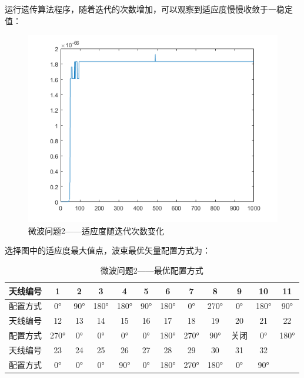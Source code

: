 \documentclass[UTF8,12pt]{ctexart}
\begin{document}
        运行遗传算法程序，随着迭代的次数增加，可以观察到适应度慢慢收敛于一稳定值：
        \begin{figure}[H]
            \centering
            \includegraphics[scale=0.7]{lian2.png}
            \caption{微波问题2——适应度随迭代次数变化}
            \end{figure}
        选择图中的适应度最大值点，波束最优矢量配置方式为：
      \begin{table}[htbp]
        \centering
        \caption{微波问题2——最优配置方式}
          \begin{tabular}{cccccccccccc}
          \toprule
          天线编号   & 1      & 2      & 3      & 4      & 5      & 6      & 7      & 8      & 9      & 10     & 11 \\
          \midrule
          配置方式   & 0°     & 90°    & 180°   & 180°   & 90°    & 180°   & 0°     & 270°   & 0°     & 180°   & 90° \\
          \midrule
          天线编号   & 12     & 13     & 14     & 15     & 16     & 17     & 18     & 19     & 20     & 21     & 22 \\
          \midrule
          配置方式   & 270°   & 0°     & 0°     & 0°     & 0°     & 180°   & 270°   & 90°    & 关闭     & 0°     & 180° \\
          \midrule
          天线编号   & 23     & 24     & 25     & 26     & 27     & 28     & 29     & 30     & 31     & 32     &  \\
          \midrule
          配置方式   & 0°     & 0°     & 0°     & 90°    & 0°     & 180°   & 270°   & 180°   & 0°     & 90°    &  \\
          \bottomrule
          \end{tabular}%
        \label{tab:addlabel}%
      \end{table}%
\end{document}
